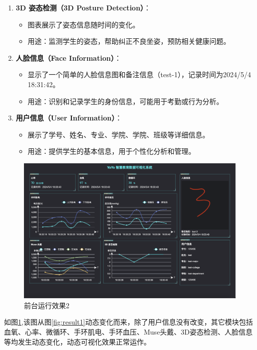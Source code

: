 \documentclass[oneside]{xduugthesis}
\begin{document}
\begin{enumerate}[nosep]
    \item \textbf{3D 姿态检测（3D Posture Detection）}：
    \begin{itemize}[nosep]
        \item 图表展示了姿态信息随时间的变化。
        \item 用途：监测学生的姿态，帮助纠正不良坐姿，预防相关健康问题。
    \end{itemize}

    \item \textbf{人脸信息（Face Information）}：
    \begin{itemize}[nosep]
        \item 显示了一个简单的人脸信息图和备注信息（test-1），记录时间为2024/5/4 18:31:42。
        \item 用途：识别和记录学生的身份信息，可能用于考勤或行为分析。
    \end{itemize}

    \item \textbf{用户信息（User Information）}：
    \begin{itemize}[nosep]
        \item 展示了学号、姓名、专业、学院、学院、班级等详细信息。
        \item 用途：提供学生的基本信息，用于个性化分析和管理。
    \end{itemize}
\end{enumerate}

\clearpage

\begin{figure}[htb]
    \centering
    \includegraphics[width=0.9\linewidth]{images/result3.png}
    \caption{前台运行效果2}
    \label{fig:result3}
\end{figure}

如图\ref{fig:result3},该图从图\ref{fig:result1}动态变化而来，除了用户信息没有改变，其它模块包括血氧、心率、微循环、手环肌电、手环血压、Muse头戴、3D姿态检测、人脸信息等均发生动态变化，动态可视化效果正常运作。


\let\cleardoublepage\clearpage
\end{document}
